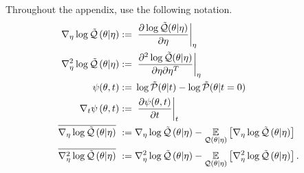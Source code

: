 \begin{defn}
%
Throughout the appendix, use the following notation.
%
\begin{align*}
%
\lqgrad{\theta \vert \eta} :={}&
    \fracat{\partial \log \qtil(\theta \vert \eta)}{\partial \eta}{\eta} \\
%
\lqhess{\theta \vert \eta} :={}&
    \fracat{\partial^2 \log \qtil(\theta \vert \eta)}
           {\partial \eta \partial \eta^T}{\eta} \\
%
\psi(\theta, \t) :={}&
    \log \ptil(\theta \vert \t) - \log \ptil(\theta \vert \t=0)\\
%
\psigrad{\theta, \t} :={}&
    \fracat{\partial \psi(\theta, \t)}{\partial \t}{\t} \\
%
\lqgradbar{\theta \vert \eta} :={}& \lqgrad{\theta \vert \eta}
  - \expect{\q(\theta \vert \eta)}{\lqgrad{\theta \vert \eta}} \\
%
\lqhessbar{\theta \vert \eta} :={}& \lqhess{\theta \vert \eta}
 - \expect{\q(\theta \vert \eta)}{\lqhess{\theta \vert \eta}}.
%
\end{align*}
%
\end{defn}

